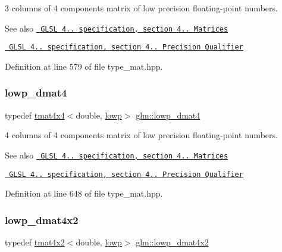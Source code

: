 3 columns of 4 components matrix of low precision floating-\/point numbers.

\begin{DoxySeeAlso}{See also}
\href{http://www.opengl.org/registry/doc/GLSLangSpec.4.20.8.pdf}{\texttt{ G\+L\+SL 4.. specification, section 4.. Matrices}} 

\href{http://www.opengl.org/registry/doc/GLSLangSpec.4.20.8.pdf}{\texttt{ G\+L\+SL 4.. specification, section 4.. Precision Qualifier}} 
\end{DoxySeeAlso}


Definition at line 579 of file type\+\_\+mat.\+hpp.

\mbox{\label{group__core__precision_gafb95042ba1765add225ae138437f860e}} 
\subsubsection{\texorpdfstring{lowp\_dmat4}{lowp\_dmat4}}
{\footnotesize\ttfamily typedef \mbox{\hyperlink{structglm_1_1tmat4x4}{tmat4x4}}$<$double, \mbox{\hyperlink{namespaceglm_a0f04f086094c747d227af4425893f545ae161af3fc695e696ce3bf69f7332bc2d}{lowp}}$>$ \mbox{\hyperlink{group__core__precision_gafb95042ba1765add225ae138437f860e}{glm\+::lowp\+\_\+dmat4}}}

4 columns of 4 components matrix of low precision floating-\/point numbers.

\begin{DoxySeeAlso}{See also}
\href{http://www.opengl.org/registry/doc/GLSLangSpec.4.20.8.pdf}{\texttt{ G\+L\+SL 4.. specification, section 4.. Matrices}} 

\href{http://www.opengl.org/registry/doc/GLSLangSpec.4.20.8.pdf}{\texttt{ G\+L\+SL 4.. specification, section 4.. Precision Qualifier}} 
\end{DoxySeeAlso}


Definition at line 648 of file type\+\_\+mat.\+hpp.

\mbox{\label{group__core__precision_gaeee03c38861981ecb29f3f71644bf3ac}} 
\subsubsection{\texorpdfstring{lowp\_dmat4x2}{lowp\_dmat4x2}}
{\footnotesize\ttfamily typedef \mbox{\hyperlink{structglm_1_1tmat4x2}{tmat4x2}}$<$double, \mbox{\hyperlink{namespaceglm_a0f04f086094c747d227af4425893f545ae161af3fc695e696ce3bf69f7332bc2d}{lowp}}$>$ \mbox{\hyperlink{group__core__precision_gaeee03c38861981ecb29f3f71644bf3ac}{glm\+::lowp\+\_\+dmat4x2}}}

